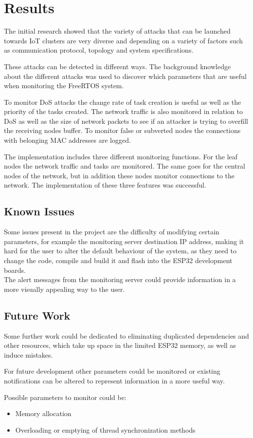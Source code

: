 \chapter{Results}
The initial research showed that the variety of attacks that can be launched towards IoT clusters are very diverse and depending on a variety of factors such as communication protocol, topology and system specifications. 

These attacks can be detected in different ways. The background knowledge about the different attacks was used to discover which parameters that are useful when monitoring the FreeRTOS system. 

To monitor DoS attacks the change rate of task creation is useful as well as the priority of the tasks created. The network traffic is also monitored in relation to DoS as well as the size of network packets to see if an attacker is trying to overfill the receiving nodes buffer. To monitor false or subverted nodes the connections with belonging MAC addresses are logged. 

The implementation includes three different monitoring functions. For the leaf nodes the network traffic and tasks are monitored. The same goes for the central nodes of the network, but in addition these nodes monitor connections to the network. The implementation of these three features was successful. 

\section{Known Issues}
Some issues present in the project are the difficulty of modifying certain parameters, for example the monitoring server destination IP address, making it hard for the user to alter the default behaviour of the system, as they need to change the code, compile and build it and flash into the ESP32 development boards.\\

The alert messages from the monitoring server could provide information in a more visually appealing way to the user.


\section{Future Work}
Some further work could be dedicated to eliminating duplicated dependencies and other resources, which take up space in the limited ESP32 memory, as well as induce mistakes.

For future development other parameters could be monitored or existing notifications can be altered to represent information in a more useful way. 

Possible parameters to monitor could be:
\begin{itemize}
    \item Memory allocation
    \item Overloading or emptying of thread synchronization methods
\end{itemize}